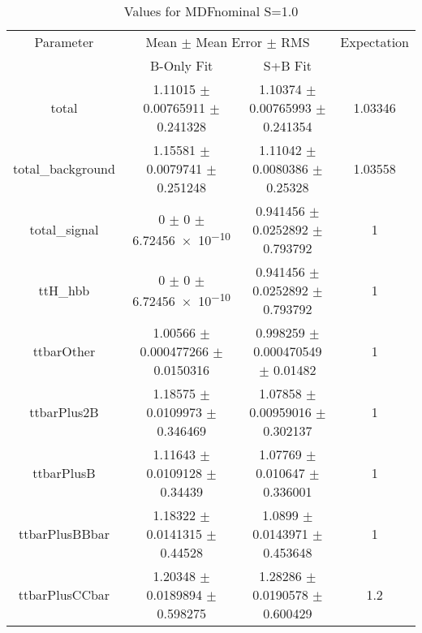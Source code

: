 \begin{table}
\centering
\caption{Values for MDFnominal S=1.0}
\begin{tabular}{cccc}
\toprule
Parameter & \multicolumn{2}{c}{Mean $\pm$ Mean Error $\pm$ RMS} & Expectation\\
 & B-Only Fit & S+B Fit & \\
\midrule
total & \num{1.11015} $\pm$ \num{0.00765911} $\pm$ \num{0.241328} & \num{1.10374} $\pm$ \num{0.00765993} $\pm$ \num{0.241354} & \num{1.03346}\\
total\_background & \num{1.15581} $\pm$ \num{0.0079741} $\pm$ \num{0.251248} & \num{1.11042} $\pm$ \num{0.0080386} $\pm$ \num{0.25328} & \num{1.03558}\\
total\_signal & \num{0} $\pm$ \num{0} $\pm$ \num{6.72456e-10} & \num{0.941456} $\pm$ \num{0.0252892} $\pm$ \num{0.793792} & \num{1}\\
ttH\_hbb & \num{0} $\pm$ \num{0} $\pm$ \num{6.72456e-10} & \num{0.941456} $\pm$ \num{0.0252892} $\pm$ \num{0.793792} & \num{1}\\
ttbarOther & \num{1.00566} $\pm$ \num{0.000477266} $\pm$ \num{0.0150316} & \num{0.998259} $\pm$ \num{0.000470549} $\pm$ \num{0.01482} & \num{1}\\
ttbarPlus2B & \num{1.18575} $\pm$ \num{0.0109973} $\pm$ \num{0.346469} & \num{1.07858} $\pm$ \num{0.00959016} $\pm$ \num{0.302137} & \num{1}\\
ttbarPlusB & \num{1.11643} $\pm$ \num{0.0109128} $\pm$ \num{0.34439} & \num{1.07769} $\pm$ \num{0.010647} $\pm$ \num{0.336001} & \num{1}\\
ttbarPlusBBbar & \num{1.18322} $\pm$ \num{0.0141315} $\pm$ \num{0.44528} & \num{1.0899} $\pm$ \num{0.0143971} $\pm$ \num{0.453648} & \num{1}\\
ttbarPlusCCbar & \num{1.20348} $\pm$ \num{0.0189894} $\pm$ \num{0.598275} & \num{1.28286} $\pm$ \num{0.0190578} $\pm$ \num{0.600429} & \num{1.2}\\
\bottomrule
\end{tabular}
\end{table}